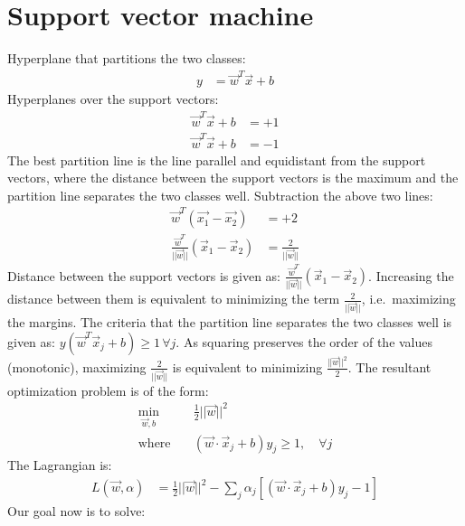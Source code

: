 \documentclass{book}
\begin{document}
\chapter{Support vector machine}
Hyperplane that partitions the two classes:
\begin{align*}
y &= \vec{w}^T\vec{x} + b
\end{align*}
Hyperplanes over the support vectors:
\begin{align*}
\vec{w}^T\vec{x} + b &= +1 \\
\vec{w}^T\vec{x} + b &= -1 
\end{align*}
The best partition line is the line parallel and equidistant from the support vectors, where the distance between the support vectors is the maximum and the partition line separates the two classes well.
Subtraction the above two lines: 
\begin{align*}
\vec{w}^T(\vec{x_1} - \vec{x_2}) &= +2 \\
\frac{\vec{w}^T}{||\vec{w}||}(\vec{x}_1 - \vec{x}_2) &= \frac{2}{||\vec{w}||} 
\end{align*}
Distance between the support vectors is given as: $\frac{\vec{w}^T}{||\vec{w}||}(\vec{x}_1 - \vec{x}_2)$. Increasing the distance between them is equivalent to minimizing the term $\frac{2}{||\vec{w}||}$, i.e.\ maximizing the margins.
The criteria that the partition line separates the two classes well is given as: $y(\vec{w}^T\vec{x}_j + b) \geq 1 \, \forall{j}$. As squaring preserves the order of the values (monotonic), maximizing $\frac{2}{||\vec{w}||}$ is equivalent to minimizing $\frac{||\vec{w}||^2}{2}$. 
The resultant optimization problem is of the form:
\begin{align*}
\min_{\vec{w},b} & \quad \frac{1}{2} ||\vec{w}||^2 \\
\mathrm{where} & \quad (\vec{w} \cdot \vec{x}_j + b)y_j \geq 1, \quad \forall j
\end{align*}
The Lagrangian is:
\begin{align*}
L(\vec{w},\alpha) & =  \frac{1}{2} ||\vec{w}||^2  - \sum_j \alpha_j [(\vec{w} \cdot \vec{x}_j + b)y_j - 1]
\end{align*}
Our goal now is to solve:
\end{document}
